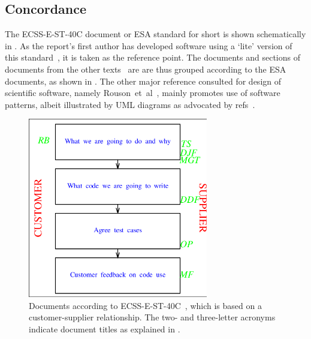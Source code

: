 \subsection{Concordance}\label{sec:concord}


The  ECSS-E-ST-40C document or ESA standard for short is shown schematically in .
As the report's first author has developed software using a `lite' version of
this standard~\cite{ecss40lite}, it is taken as the reference point. The documents and sections
of documents from the other texts~\cite{hewittexc, Sm17Rati, sommerville10} are
are thus grouped according to the ESA documents, as shown in .
The other major reference consulted for design of scientific software, namely
Rouson~et~al~\cite{rousonxiaxu}, mainly promotes use of software patterns, albeit 
illustrated by UML diagrams as advocated by refs~\cite{hewittexc, sommerville10}.
\begin{figure}
\centerline{\includegraphics[width=0.7\textwidth]{../png/ecsl2}}
\caption{
Documents according to ECSS-E-ST-40C~,
which is based on a customer-supplier relationship.
The two- and three-letter acronyms indicate document titles as explained
in .
\label{fig:ecsl2}}
\end{figure}
